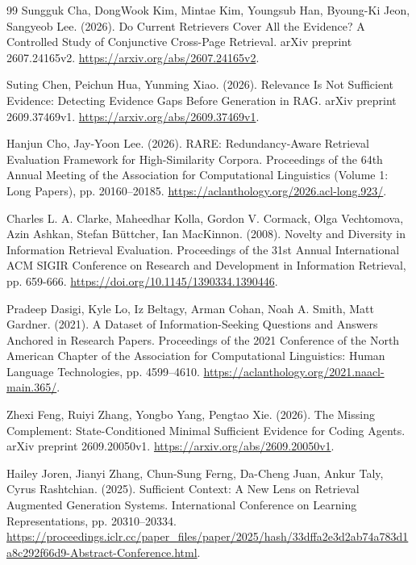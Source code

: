 \documentclass[twoside,a4paper,11pt]{article}
\begin{document}
\begin{thebibliography}{99}
Sungguk Cha, DongWook Kim, Mintae Kim, Youngsub Han, Byoung-Ki Jeon, Sangyeob Lee. (2026). Do Current Retrievers Cover All the Evidence? A Controlled Study of Conjunctive Cross-Page Retrieval. arXiv preprint 2607.24165v2. \url{https://arxiv.org/abs/2607.24165v2}.

Suting Chen, Peichun Hua, Yunming Xiao. (2026). Relevance Is Not Sufficient Evidence: Detecting Evidence Gaps Before Generation in RAG. arXiv preprint 2609.37469v1. \url{https://arxiv.org/abs/2609.37469v1}.

Hanjun Cho, Jay-Yoon Lee. (2026). RARE: Redundancy-Aware Retrieval Evaluation Framework for High-Similarity Corpora. Proceedings of the 64th Annual Meeting of the Association for Computational Linguistics (Volume 1: Long Papers), pp. 20160--20185. \url{https://aclanthology.org/2026.acl-long.923/}.

Charles L. A. Clarke, Maheedhar Kolla, Gordon V. Cormack, Olga Vechtomova, Azin Ashkan, Stefan B\"{u}ttcher, Ian MacKinnon. (2008). Novelty and Diversity in Information Retrieval Evaluation. Proceedings of the 31st Annual International ACM SIGIR Conference on Research and Development in Information Retrieval, pp. 659-666. \url{https://doi.org/10.1145/1390334.1390446}.

Pradeep Dasigi, Kyle Lo, Iz Beltagy, Arman Cohan, Noah A. Smith, Matt Gardner. (2021). A Dataset of Information-Seeking Questions and Answers Anchored in Research Papers. Proceedings of the 2021 Conference of the North American Chapter of the Association for Computational Linguistics: Human Language Technologies, pp. 4599--4610. \url{https://aclanthology.org/2021.naacl-main.365/}.

Zhexi Feng, Ruiyi Zhang, Yongbo Yang, Pengtao Xie. (2026). The Missing Complement: State-Conditioned Minimal Sufficient Evidence for Coding Agents. arXiv preprint 2609.20050v1. \url{https://arxiv.org/abs/2609.20050v1}.

Hailey Joren, Jianyi Zhang, Chun-Sung Ferng, Da-Cheng Juan, Ankur Taly, Cyrus Rashtchian. (2025). Sufficient Context: A New Lens on Retrieval Augmented Generation Systems. International Conference on Learning Representations, pp. 20310--20334. \url{https://proceedings.iclr.cc/paper_files/paper/2025/hash/33dffa2e3d2ab74a783d1a8c292f66d9-Abstract-Conference.html}.


\end{thebibliography}
\end{document}
